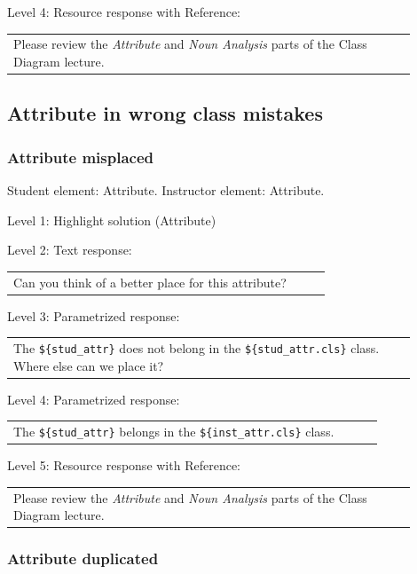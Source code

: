 \noindent Level 4: Resource response with Reference: \medskip

\begin{tabular}{|p{0.9\linewidth}}
Please review the \textit{Attribute} and \textit{Noun Analysis} parts of the Class Diagram lecture.
\end{tabular} \medskip


\subsection{Attribute in wrong class mistakes}

\subsubsection{Attribute misplaced}

Student element: Attribute. Instructor element: Attribute. \medskip

\noindent Level 1: Highlight solution (Attribute) \medskip

\noindent Level 2: Text response: \medskip

\begin{tabular}{|p{0.9\linewidth}}
Can you think of a better place for this attribute?
\end{tabular} \medskip

\noindent Level 3: Parametrized response: \medskip

\begin{tabular}{|p{0.9\linewidth}}
The \verb|${stud_attr}| does not belong in the \verb|${stud_attr.cls}| class. Where else can we place it?
\end{tabular} \medskip

\noindent Level 4: Parametrized response: \medskip

\begin{tabular}{|p{0.9\linewidth}}
The \verb|${stud_attr}| belongs in the \verb|${inst_attr.cls}| class.
\end{tabular} \medskip

\noindent Level 5: Resource response with Reference: \medskip

\begin{tabular}{|p{0.9\linewidth}}
Please review the \textit{Attribute} and \textit{Noun Analysis} parts of the Class Diagram lecture.
\end{tabular} \medskip


\subsubsection{Attribute duplicated}

